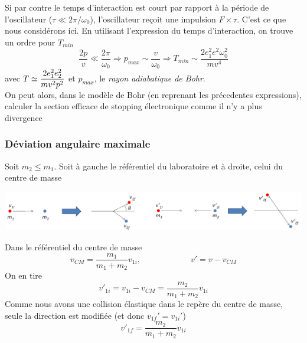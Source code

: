 Si par contre le temps d'interaction est court par rapport à la période de l'oscillateur 
($\tau \ll 2\pi/\omega_0$), l'oscillateur reçoit une impulsion $F\times\tau$. C'est ce que
nous considérons ici. En utilisant l'expression du temps d'interaction, on trouve un ordre
pour $T_{min}$
\begin{equation}
\frac{2p}{v}\ll\frac{2\pi}{\omega_0} \Rightarrow p_{max}\sim\frac{v}{\omega_0}
 \Rightarrow T_{min}\sim\frac{2e_1^2e^2\omega_0^2}{mv^4}
\end{equation}
avec $\displaystyle T\simeq \frac{2e_1^2e_2^2}{mv^2p^2}$ et $p_{max}$, le 
\textit{rayon adiabatique de Bohr}.\\

On peut alors, dans le modèle de Bohr (en reprenant les précedentes expressions), calculer 
la section efficace de stopping électronique comme il n'y a plus divergence \\



\subsubsection{Déviation angulaire maximale}
Soit $m_2\leq m_1$. Soit à gauche le référentiel du laboratoire et à droite, celui du centre de 
masse
\begin{center}
	\includegraphics[scale=0.45]{ch1/image11.png}
\end{center}
Dans le référentiel du centre de masse
\begin{equation}
v_{CM}=\frac{m_1}{m_1+m_2}v_{1i},\qquad\qquad\qquad v'=v-v_{CM}
\end{equation}
On en tire
\begin{equation}
v'_{1i}=v_{1i}-v_{CM}=\frac{m_2}{m_1+m_2}v_{1i}
\end{equation}
Comme nous avons une collision élastique dans le repère du centre de masse, seule la direction
est modifiée (et donc $v_{1f}'=v_{1i}'$)
\begin{equation}
v'_{1f}=\frac{m_2}{m_1+m_2}v_{1i}
\end{equation}

